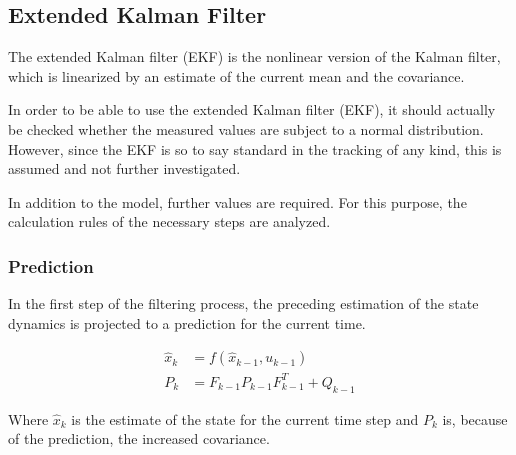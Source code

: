 \documentclass[11pt,oneside,openright]{mpreport}
\begin{document}
\subsection{Extended Kalman Filter}



The extended Kalman filter (EKF) \cite{Ribeiro2004} is the nonlinear version of the Kalman filter, which is linearized by an estimate of the current mean and the covariance.

In order to be able to use the extended Kalman filter (EKF), it should actually be checked whether the measured values
are subject to a normal distribution. However, since the EKF is so to say 
standard in the tracking of any kind\cite{Li2010, Wan2006}, this is assumed and not further investigated.

In addition to the model, further values are required. For this purpose, the calculation rules of the necessary steps are analyzed.

\subsubsection{Prediction}

In the first step of the filtering process, the preceding estimation of the state dynamics is projected to a prediction for the current time.

\begin{align*}
\hat{x}_{k} &= f(\hat{x}_{k-1},u_{k-1})\\
P_{k}&=F_{k-1} P_{k-1} {F^T_{k-1}} + Q_{k-1}
\end{align*}

Where $\hat{x}_{k}$ is the estimate of the state for the current time step and $P_{k}$ is, because of the prediction, the increased covariance.

\end{document}

